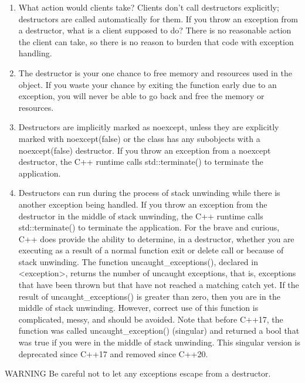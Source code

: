 \begin{enumerate}
\item
What action would clients take? Clients don’t call destructors explicitly; destructors are called automatically for them. If you throw an exception from a destructor, what is a client supposed to do? There is no reasonable action the client can take, so there is no reason to burden that code with exception handling.

\item
The destructor is your one chance to free memory and resources used in the object. If you waste your chance by exiting the function early due to an exception, you will never be able to go back and free the memory or resources.

\item
Destructors are implicitly marked as noexcept, unless they are explicitly marked with noexcept(false) or the class has any subobjects with a noexcept(false) destructor. If you throw an exception from a noexcept destructor, the C++ runtime calls std::terminate() to terminate the application.

\item
Destructors can run during the process of stack unwinding while there is another exception being handled. If you throw an exception from the destructor in the middle of stack unwinding, the C++ runtime calls std::terminate() to terminate the application. For the brave and curious, C++ does provide the ability to determine, in a destructor, whether you are executing as a result of a normal function exit or delete call or because of stack unwinding. The function uncaught\_exceptions(), declared in <exception>, returns the number of uncaught exceptions, that is, exceptions that have been thrown but that have not reached a matching catch yet. If the result of uncaught\_exceptions() is greater than zero, then you are in the middle of stack unwinding. However, correct use of this function is complicated, messy, and should be avoided. Note that before C++17, the function was called uncaught\_exception() (singular) and returned a bool that was true if you were in the middle of stack unwinding. This singular version is deprecated since C++17 and removed since C++20.
\end{enumerate}

\begin{myWarning}{WARNING}
Be careful not to let any exceptions escape from a destructor.
\end{myWarning}

















